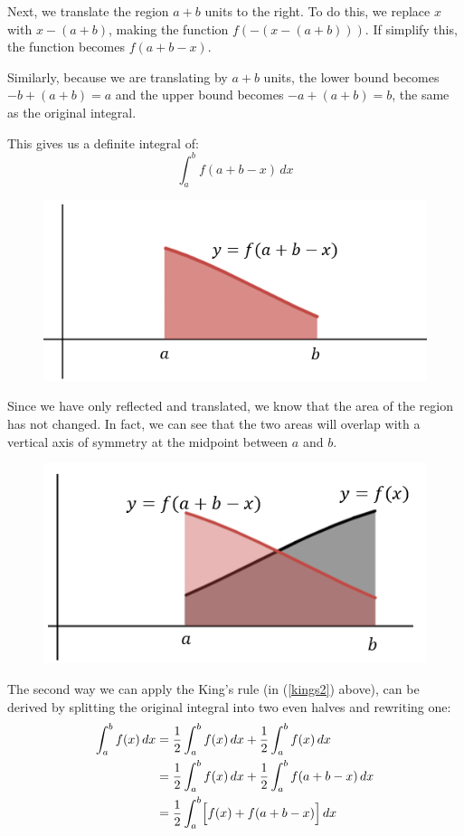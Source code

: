 \documentclass[../main.tex]{subfiles}
\begin{document}
Next, we translate the region $a+b$ units to the right. To do this, we replace $x$ with $x-(a+b)$, making the function $f(-(x-(a+b)))$. If simplify this, the function becomes $f(a+b-x)$.

Similarly, because we are translating by $a+b$ units, the lower bound becomes $-b+(a+b)=a$ and the upper bound becomes $-a+(a+b)=b$, the same as the original integral.

This gives us a definite integral of:
\[\int_{a}^{b} f(a+b-x)\,dx\]

\begin{figure}[h]
    \centering
    \includegraphics{images/kingsrule3.png}
\end{figure}

Since we have only reflected and translated, we know that the area of the region has not changed. In fact, we can see that the two areas will overlap with a vertical axis of symmetry at the midpoint between $a$ and $b$.

\begin{figure}[h]
    \centering
    \includegraphics{images/kingsrule4.png}
\end{figure}

The second way we can apply the King's rule (in (\ref{kings2}) above), can be derived by splitting the original integral into two even halves and rewriting one:
\begin{align*}
    \int_{a}^{b} f(x)\,dx &= \frac{1}{2}\int_{a}^{b} f(x)\,dx + \frac{1}{2}\int_{a}^{b} f(x)\,dx \\
    &=\frac{1}{2}\int_{a}^{b} f(x)\,dx + \frac{1}{2}\int_{a}^{b} f(a+b-x)\, dx \\
    &= \frac{1}{2}\int_{a}^{b} \Bigl[f(x) + f(a+b-x)\Bigl]\, dx
\end{align*}
\end{document}
